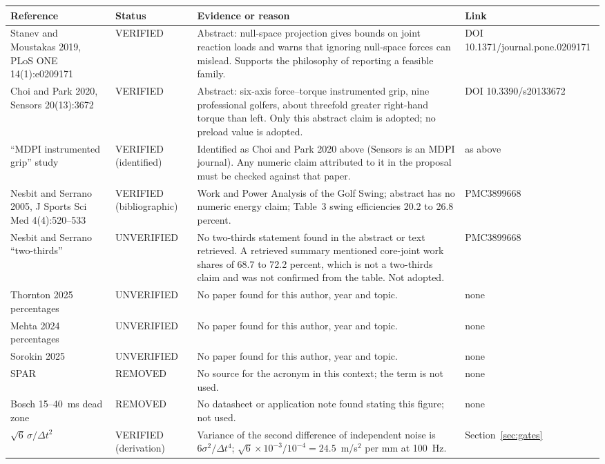 \documentclass[11pt,a4paper]{article}
\begin{document}
\begin{longtable}{@{}p{3.4cm}p{2.6cm}p{6.0cm}p{2.3cm}@{}}
\toprule
Reference & Status & Evidence or reason & Link \\
\midrule
\endhead
Stanev and Moustakas 2019, PLoS ONE 14(1):e0209171 & VERIFIED & Abstract: null-space projection gives bounds on joint reaction loads and warns that ignoring null-space forces can mislead.  Supports the philosophy of reporting a feasible family. & DOI 10.1371/journal.pone.0209171 \\
Choi and Park 2020, Sensors 20(13):3672 & VERIFIED & Abstract: six-axis force--torque instrumented grip, nine professional golfers, about threefold greater right-hand torque than left.  Only this abstract claim is adopted; no preload value is adopted. & DOI 10.3390/s20133672 \\
``MDPI instrumented grip'' study & VERIFIED (identified) & Identified as Choi and Park 2020 above (Sensors is an MDPI journal).  Any numeric claim attributed to it in the proposal must be checked against that paper. & as above \\
Nesbit and Serrano 2005, J Sports Sci Med 4(4):520--533 & VERIFIED (bibliographic) & Work and Power Analysis of the Golf Swing; abstract has no numeric energy claim; Table~3 swing efficiencies 20.2 to 26.8 percent. & PMC3899668 \\
Nesbit and Serrano ``two-thirds'' & UNVERIFIED & No two-thirds statement found in the abstract or text retrieved.  A retrieved summary mentioned core-joint work shares of 68.7 to 72.2 percent, which is not a two-thirds claim and was not confirmed from the table.  Not adopted. & PMC3899668 \\
Thornton 2025 percentages & UNVERIFIED & No paper found for this author, year and topic. & none \\
Mehta 2024 percentages & UNVERIFIED & No paper found for this author, year and topic. & none \\
Sorokin 2025 & UNVERIFIED & No paper found for this author, year and topic. & none \\
SPAR & REMOVED & No source for the acronym in this context; the term is not used. & none \\
Bosch 15--40~ms dead zone & REMOVED & No datasheet or application note found stating this figure; not used. & none \\
$\sqrt6\,\sigma/\Delta t^2$ & VERIFIED (derivation) & Variance of the second difference of independent noise is $6\sigma^2/\Delta t^4$; $\sqrt6\times10^{-3}/10^{-4}=24.5$~m/s$^2$ per mm at 100~Hz. & Section~\ref{sec:gates} \\

\end{longtable}
\end{document}

